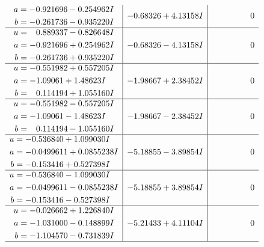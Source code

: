 \documentclass[1p]{elsarticle_modified}
\theoremstyle{definition}
\begin{document}
$$\begin{array}{c|c|c}
\begin{aligned}
a &= -0.921696 - 0.254962 I \\
b &= -0.261736 - 0.935220 I\end{aligned}
 & -0.68326 + 4.13158 I & \phantom{-0.000000 } 0 \\ \hline\begin{aligned}
u &= \phantom{-}0.889337 - 0.826648 I \\
a &= -0.921696 + 0.254962 I \\
b &= -0.261736 + 0.935220 I\end{aligned}
 & -0.68326 - 4.13158 I & \phantom{-0.000000 } 0 \\ \hline\begin{aligned}
u &= -0.551982 + 0.557205 I \\
a &= -1.09061 + 1.48623 I \\
b &= \phantom{-}0.114194 + 1.055160 I\end{aligned}
 & -1.98667 + 2.38452 I & \phantom{-0.000000 } 0 \\ \hline\begin{aligned}
u &= -0.551982 - 0.557205 I \\
a &= -1.09061 - 1.48623 I \\
b &= \phantom{-}0.114194 - 1.055160 I\end{aligned}
 & -1.98667 - 2.38452 I & \phantom{-0.000000 } 0 \\ \hline\begin{aligned}
u &= -0.536840 + 1.099030 I \\
a &= -0.0499611 + 0.0855238 I \\
b &= -0.153416 + 0.527398 I\end{aligned}
 & -5.18855 - 3.89854 I & \phantom{-0.000000 } 0 \\ \hline\begin{aligned}
u &= -0.536840 - 1.099030 I \\
a &= -0.0499611 - 0.0855238 I \\
b &= -0.153416 - 0.527398 I\end{aligned}
 & -5.18855 + 3.89854 I & \phantom{-0.000000 } 0 \\ \hline\begin{aligned}
u &= -0.026662 + 1.226840 I \\
a &= -1.031000 - 0.148899 I \\
b &= -1.104570 - 0.731839 I\end{aligned}
 & -5.21433 + 4.11104 I & \phantom{-0.000000 } 0\\
 \hline 
 \end{array}$$\newpage$$\begin{array}{c|c|c}  

\end{array}$$
\end{document}
